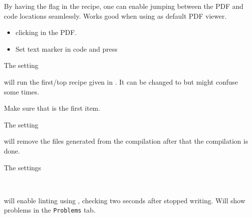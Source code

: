 
By having the flag  in the recipe, one can enable jumping between the PDF and code locations seamlessly. Works good when using  as default PDF viewer.

\begin{itemize}
    \item {} clicking in the PDF.
    \item Set text marker in code and press 
\end{itemize}


The setting


will run the first/top recipe given in . It can be changed to  but might confuse some times.

Make sure that  is the first item.



The setting


will remove the  files generated from the compilation after that the compilation is done.



The settings

\\

will enable linting using , checking two seconds after stopped writing. Will show problems in the \texttt{Problems} tab.

